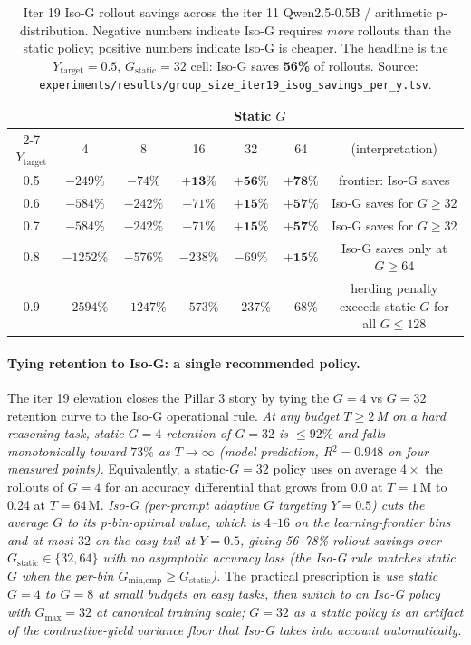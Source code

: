 \begin{table}[htbp]
\centering
\small
\begin{tabular}{ccccccc}
\toprule
& \multicolumn{6}{c}{Static $G$} \\
\cmidrule(lr){2-7}
$Y_\text{target}$ & 4 & 8 & 16 & 32 & 64 & (interpretation) \\
\midrule
0.5 & $-249\%$ & $-74\%$ & $\mathbf{+13\%}$ & $\mathbf{+56\%}$ & $\mathbf{+78\%}$ & frontier: Iso-G saves \\
0.6 & $-584\%$ & $-242\%$ & $-71\%$ & $\mathbf{+15\%}$ & $\mathbf{+57\%}$ & Iso-G saves for $G \ge 32$ \\
0.7 & $-584\%$ & $-242\%$ & $-71\%$ & $\mathbf{+15\%}$ & $\mathbf{+57\%}$ & Iso-G saves for $G \ge 32$ \\
0.8 & $-1252\%$ & $-576\%$ & $-238\%$ & $-69\%$ & $\mathbf{+15\%}$ & Iso-G saves only at $G \ge 64$ \\
0.9 & $-2594\%$ & $-1247\%$ & $-573\%$ & $-237\%$ & $-68\%$ & herding penalty exceeds static $G$ for all $G \le 128$ \\
\bottomrule
\end{tabular}
\caption{Iter 19 Iso-G rollout savings across the iter 11
Qwen2.5-0.5B / arithmetic p-distribution.  Negative numbers indicate
Iso-G requires \emph{more} rollouts than the static policy; positive
numbers indicate Iso-G is cheaper.  The headline is the
$Y_\text{target}{=}0.5$, $G_\text{static}{=}32$ cell: Iso-G saves
\textbf{56\%} of rollouts.  Source:
\texttt{experiments/results/group\_size\_iter19\_isog\_savings\_per\_y.tsv}.}
\label{tab:iter19-isog}
\end{table}

\paragraph{Tying retention to Iso-G: a single recommended policy.}
The iter 19 elevation closes the Pillar 3 story by tying the
$G{=}4$ vs $G{=}32$ retention curve to the Iso-G operational rule.
\emph{At any budget $T \ge 2$\,M on a hard reasoning task, static
$G{=}4$ retention of $G{=}32$ is $\le 92\%$ and falls monotonically
toward $73\%$ as $T \to \infty$ (model prediction, R$^2{=}0.948$ on
four measured points).}  Equivalently, a static-$G{=}32$ policy uses
on average $4{\times}$ the rollouts of $G{=}4$ for an accuracy
differential that grows from 0.0 at $T{=}1$\,M to 0.24 at $T{=}64$\,M.
\emph{Iso-G (per-prompt adaptive $G$ targeting $Y{=}0.5$) cuts the
average $G$ to its p-bin-optimal value, which is $4$--$16$ on the
learning-frontier bins and at most $32$ on the easy tail at $Y{=}0.5$,
giving 56--78\% rollout savings over $G_\text{static} \in \{32, 64\}$
with no asymptotic accuracy loss (the Iso-G rule matches static
$G$ when the per-bin $G_\text{min,emp} \ge G_\text{static}$).}  The
practical prescription is \emph{use static $G{=}4$ to $G{=}8$ at
small budgets on easy tasks, then switch to an Iso-G policy with
$G_{\max} = 32$ at canonical training scale; $G{=}32$ as a static policy
is an artifact of the contrastive-yield variance floor that Iso-G
takes into account automatically.}

